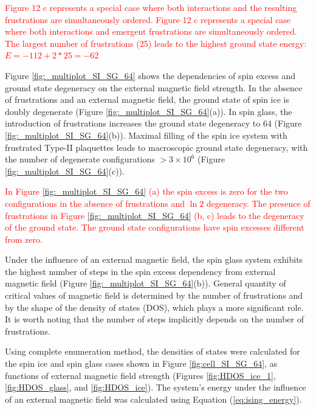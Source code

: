 \documentclass[preprint,12pt]{elsarticle}
\begin{document}
\textcolor{red}{Figure 12 c represents a special case where both interactions and the resulting frustrations are simultaneously ordered. Figure 12 c represents a special case where both interactions and emergent frustrations are simultaneously ordered. The largest number of frustrations (25) leads to the highest ground state energy: $E = -112 + 2*25 = -62$}

Figure \ref{fig:_multiplot_SI_SG_64} shows the dependencies of spin excess and ground state degeneracy on the external magnetic field strength.
In the absence of frustrations and an external magnetic field, the ground state of spin ice is doubly degenerate (Figure \ref{fig:_multiplot_SI_SG_64}(a)).
In spin glass, the introduction of frustrations increases the ground state degeneracy to 64 (Figure \ref{fig:_multiplot_SI_SG_64}(b)).
Maximal filling of the spin ice system with frustrated Type-II plaquettes leads to macroscopic ground state degeneracy, with the number of degenerate configurations $> 3\times10^{6}$ (Figure \ref{fig:_multiplot_SI_SG_64}(c)).

\textcolor{red}{In Figure \ref{fig:_multiplot_SI_SG_64} (a) the spin excess is zero for the two configurations in the absence of frustrations and $\ln 2$ degeneracy. The presence of frustrations in Figure \ref{fig:_multiplot_SI_SG_64} (b, c) leads to the degeneracy of the ground state. The ground state configurations have spin excesses different from zero.}

Under the influence of an external magnetic field, the spin glass system exhibits the highest number of steps in the spin excess dependency from external magnetic field (Figure \ref{fig:_multiplot_SI_SG_64}(b)).
General quantity of critical values of magnetic field is determined by the number of frustrations and by the shape of the density of states (DOS), which plays a more significant role.
It is worth noting that the number of steps implicitly depends on the number of frustrations.

Using complete enumeration method, the densities of states were calculated for the spin ice and spin glass cases shown in Figure \ref{fig:cell_SI_SG_64}, as functions of external magnetic field strength (Figures \ref{fig:HDOS_ice_1}, \ref{fig:HDOS_glass}, and \ref{fig:HDOS_ice}).
The system's energy under the influence of an external magnetic field was calculated using Equation (\ref{eq:ising_energy}).
\end{document}
